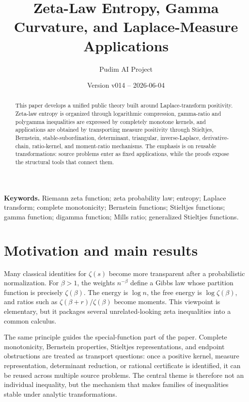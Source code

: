 \documentclass[11pt]{article}
\title{Zeta-Law Entropy, Gamma Curvature, and Laplace-Measure Applications}
\author{Pudim AI Project}
\date{Version v014 -- 2026-06-04}
\numberwithin{equation}{section}
\theoremstyle{definition}
\theoremstyle{remark}
\newcommand{\1}{\mathbf 1}
\begin{document}
\maketitle

\begin{abstract}
This paper develops a unified public theory built around Laplace-transform
positivity.  Zeta-law entropy is organized through logarithmic compression,
gamma-ratio and polygamma inequalities are expressed by completely monotone
kernels, and applications are obtained by transporting measure positivity
through Stieltjes, Bernstein, stable-subordination, determinant, triangular,
inverse-Laplace, derivative-chain, ratio-kernel, and moment-ratio mechanisms.
The emphasis is on reusable transformations: source problems enter as fixed
applications, while the proofs expose the structural tools that connect them.
\end{abstract}

\tableofcontents

\medskip



\noindent\textbf{Keywords.} Riemann zeta function; zeta probability law; entropy; Laplace transform; complete monotonicity; Bernstein functions; Stieltjes functions; gamma function; digamma function; Mills ratio; generalized Stieltjes functions.

\section{Motivation and main results}

Many classical identities for \(\zeta(s)\) become more transparent after a
probabilistic normalization.  For \(\beta>1\), the weights \(n^{-\beta}\)
define a Gibbs law whose partition function is precisely \(\zeta(\beta)\).
The energy is \(\log n\), the free energy is \(\log\zeta(\beta)\), and ratios
such as \(\zeta(\beta+r)/\zeta(\beta)\) become moments.  This viewpoint is
elementary, but it packages several unrelated-looking zeta inequalities into a
common calculus.

The same principle guides the special-function part of the paper.  Complete
monotonicity, Bernstein properties, Stieltjes representations, and endpoint
obstructions are treated as transport questions: once a positive kernel,
measure representation, determinant reduction, or rational certificate is
identified, it can be reused across multiple source problems.  The central
theme is therefore not an individual inequality, but the mechanism that makes
families of inequalities stable under analytic transformations.
\end{document}
